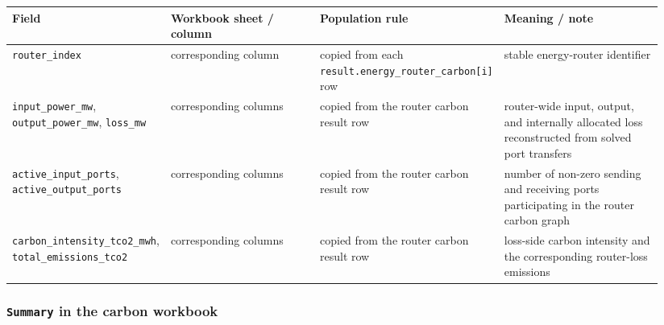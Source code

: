 \begin{longtable}{@{}L{0.18\linewidth}L{0.26\linewidth}L{0.22\linewidth}L{0.28\linewidth}@{}}
\toprule
Field & Workbook sheet / column & Population rule & Meaning / note \\
\midrule
\endhead
\texttt{router\_index} & corresponding column & copied from each \texttt{result.energy\_router\_carbon[i]} row & stable energy-router identifier \\
\texttt{input\_power\_mw}, \texttt{output\_power\_mw}, \texttt{loss\_mw} & corresponding columns & copied from the router carbon result row & router-wide input, output, and internally allocated loss reconstructed from solved port transfers \\
\texttt{active\_input\_ports}, \texttt{active\_output\_ports} & corresponding columns & copied from the router carbon result row & number of non-zero sending and receiving ports participating in the router carbon graph \\
\texttt{carbon\_intensity\_tco2\_mwh}, \texttt{total\_emissions\_tco2} & corresponding columns & copied from the router carbon result row & loss-side carbon intensity and the corresponding router-loss emissions \\
\bottomrule
\end{longtable}

\subsubsection*{\texttt{Summary} in the carbon workbook}

